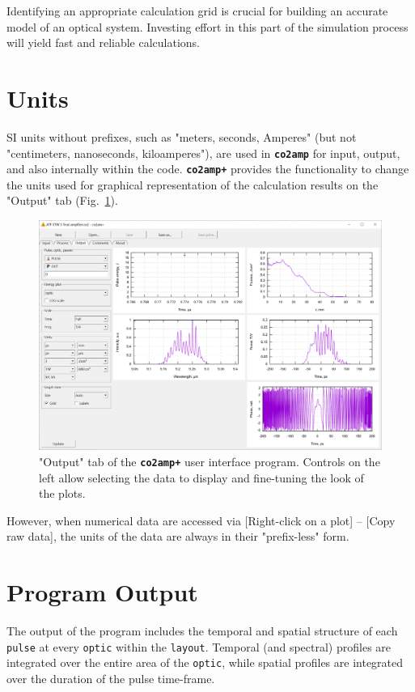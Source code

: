 Identifying an appropriate calculation grid is crucial for building an accurate model of an optical system. Investing effort in this part of the simulation process will yield fast and reliable calculations.


\section{Units}
SI units without prefixes, such as "meters, seconds, Amperes" (but not "centimeters, nanoseconds, kiloamperes"), are used in \textbf{\texttt{co2amp}} for input, output, and also internally within the code. \textbf{\texttt{co2amp+}} provides the functionality to change the units used for graphical representation of the calculation results on the "Output" tab (Fig.~\ref{fig:gui-output}).
\begin{figure}[ht]
 \centering
 \includegraphics[width=14cm]{images/gui-output}
 \caption{"Output" tab of the \textbf{\texttt{co2amp+}} user interface program. Controls on the left allow selecting the data to display and fine-tuning the look of the plots.}
 \label{fig:gui-output}
\end{figure}
However, when numerical data are accessed via [Right-click on a plot] -- [Copy raw data], the units of the data are always in their "prefix-less" form.


\section{Program Output}
The output of the program includes the temporal and spatial structure of each \texttt{pulse} at every \texttt{optic} within the \texttt{layout}. Temporal (and spectral) profiles are integrated over the entire area of the \texttt{optic}, while spatial profiles are integrated over the duration of the pulse time-frame.

